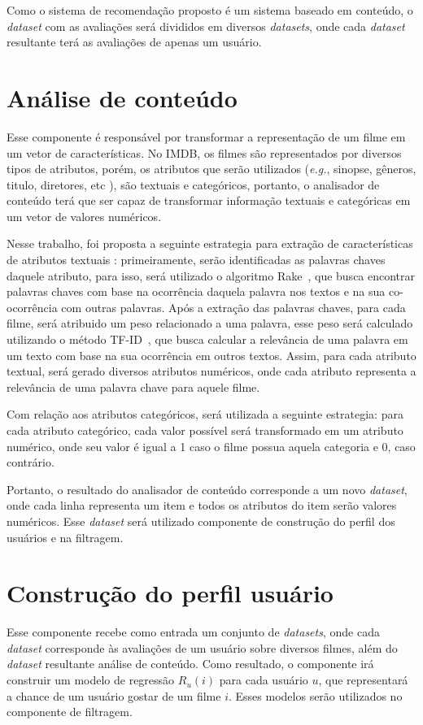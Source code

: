 Como o sistema de recomendação proposto é um sistema baseado em conteúdo, o \textit{dataset} com as avaliações será divididos em diversos \textit{datasets}, onde cada \textit{dataset} resultante terá as avaliações de apenas um usuário.

\section{Análise de conteúdo}
Esse componente é responsável por transformar a representação de um filme em um vetor de características. No IMDB, os filmes são representados por diversos tipos de atributos, porém, os atributos que serão utilizados (\textit{e.g.}, sinopse, gêneros, titulo, diretores, etc ), são textuais e categóricos, portanto, o analisador de conteúdo terá que ser capaz de transformar informação textuais e categóricas em um vetor de valores numéricos. 

Nesse trabalho, foi proposta a seguinte estrategia para extração de características de atributos textuais : primeiramente, serão identificadas as palavras chaves daquele atributo, para isso, será utilizado o algoritmo Rake~\cite{inbook}, que busca encontrar palavras chaves com base na ocorrência daquela palavra nos textos e na sua co-ocorrência com outras palavras. Após a extração das palavras chaves, para cada filme, será atribuido um peso relacionado a uma palavra, esse peso será calculado utilizando o método TF-ID~\cite{salton1989automatic}, que busca calcular a relevância de uma palavra em um texto com base na sua ocorrência em outros textos. Assim, para cada atributo textual, será gerado diversos atributos numéricos, onde cada atributo representa a relevância de uma palavra chave para aquele filme.

Com relação aos atributos categóricos, será utilizada a seguinte estrategia: para cada atributo categórico, cada valor possível será transformado em um atributo numérico, onde seu valor é igual a 1 caso o filme possua aquela categoria e 0, caso contrário.

Portanto, o resultado do analisador de conteúdo corresponde a um novo \textit{dataset}, onde cada linha representa um item e todos os atributos do item serão valores numéricos. Esse \textit{dataset} será utilizado componente de construção do perfil dos usuários e na filtragem.


\section{Construção do perfil usuário}
Esse componente recebe como entrada um conjunto de \textit{datasets}, onde cada \textit{dataset} corresponde às avaliações de um usuário sobre diversos filmes, além do \textit{dataset} resultante análise de conteúdo. Como resultado, o componente irá construir um modelo de regressão \(R_u(i)\) para cada usuário \(u\), que representará a chance de um usuário gostar de um filme \(i\). Esses modelos serão utilizados no componente de filtragem.


